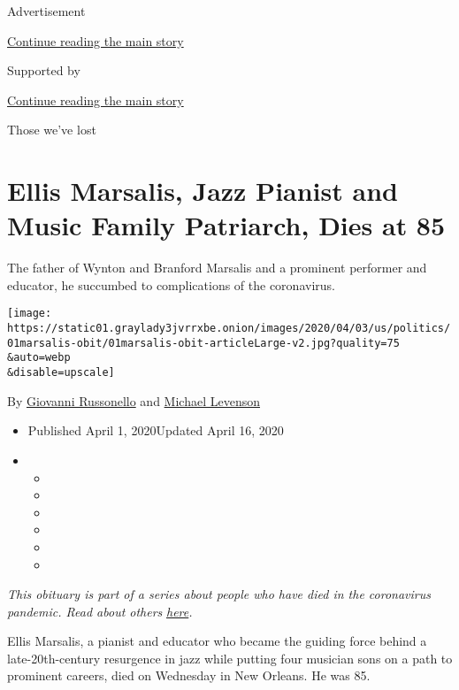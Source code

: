 Advertisement

\protect\hyperlink{after-top}{Continue reading the main story}

Supported by

\protect\hyperlink{after-sponsor}{Continue reading the main story}

Those we've lost

\hypertarget{ellis-marsalis-jazz-pianist-and-music-family-patriarch-dies-at-85}{%
\section{Ellis Marsalis, Jazz Pianist and Music Family Patriarch, Dies
at
85}\label{ellis-marsalis-jazz-pianist-and-music-family-patriarch-dies-at-85}}

The father of Wynton and Branford Marsalis and a prominent performer and
educator, he succumbed to complications of the coronavirus.

\texttt{[image: https://static01.graylady3jvrrxbe.onion/images/2020/04/03/us/politics/01marsalis-obit/01marsalis-obit-articleLarge-v2.jpg?quality=75\\\&auto=webp\\\&disable=upscale]}

By
\href{https://www.nytimes3xbfgragh.onion/by/giovanni-russonello}{Giovanni
Russonello} and
\href{https://www.nytimes3xbfgragh.onion/by/michael-levenson}{Michael
Levenson}

\begin{itemize}
\item
  Published April 1, 2020Updated April 16, 2020
\item
  \begin{itemize}
  \item
  \item
  \item
  \item
  \item
  \item
  \end{itemize}
\end{itemize}

\emph{This obituary is part of a series about people who have died in
the coronavirus pandemic. Read about others}
\href{https://www.nytimes3xbfgragh.onion/series/people-who-have-died-of-the-coronavirus}{\emph{here}}\emph{.}

Ellis Marsalis, a pianist and educator who became the guiding force
behind a late-20th-century resurgence in jazz while putting four
musician sons on a path to prominent careers, died on Wednesday in New
Orleans. He was 85.


